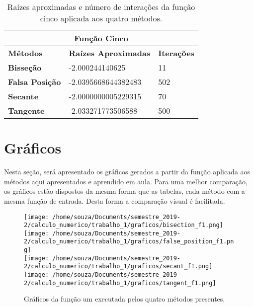 \documentclass[12pt]{article}
\begin{document}
\begin{table}[!h]
\begin{center}
\begin{tabular}{lll}
\multicolumn{3}{c}{\textbf{Função Cinco}}                                                                           \\ \hline
\multicolumn{1}{l|}{\textbf{Métodos}}       & \multicolumn{1}{l|}{\textbf{Raízes Aproximadas}} & \textbf{Iterações} \\ \hline
\multicolumn{1}{l|}{\textbf{Bisseção}}      & \multicolumn{1}{l|}{-2.000244140625}             & 11                 \\ \hline
\multicolumn{1}{l|}{\textbf{Falsa Posição}} & \multicolumn{1}{l|}{-2.0395668644382483}         & 502                \\ \hline
\multicolumn{1}{l|}{\textbf{Secante}}       & \multicolumn{1}{l|}{-2.0000000005229315}         & 70                 \\ \hline
\multicolumn{1}{l|}{\textbf{Tangente}}      & \multicolumn{1}{l|}{-2.033271773506588}          & 500               
\end{tabular}
    \caption{Raízes aproximadas e número de interações da função cinco aplicada aos quatro métodos.}
\end{center}
\end{table}
\section{Gráficos}
Nesta seção, será apresentado os gráficos gerados a partir da função aplicada aos métodos aqui apresentados e aprendido em aula. Para uma melhor comparação, os gráficos estão dispostos da mesma forma que as tabelas, cada método com a mesma função de entrada. Desta forma a comparação visual é facilitada.

\begin{figure}[!h]
    \centering
    \texttt{[image: /home/souza/Documents/semestre\_2019-2/calculo\_numerico/trabalho\_1/graficos/bisection\_f1.png]}
    \texttt{[image: /home/souza/Documents/semestre\_2019-2/calculo\_numerico/trabalho\_1/graficos/false\_position\_f1.png]}\\
    \texttt{[image: /home/souza/Documents/semestre\_2019-2/calculo\_numerico/trabalho\_1/graficos/secant\_f1.png]}
    \texttt{[image: /home/souza/Documents/semestre\_2019-2/calculo\_numerico/trabalho\_1/graficos/tangent\_f1.png]}
    \caption{Gráficos da função um executada pelos quatro métodos presentes.}
\end{figure}
\end{document}
